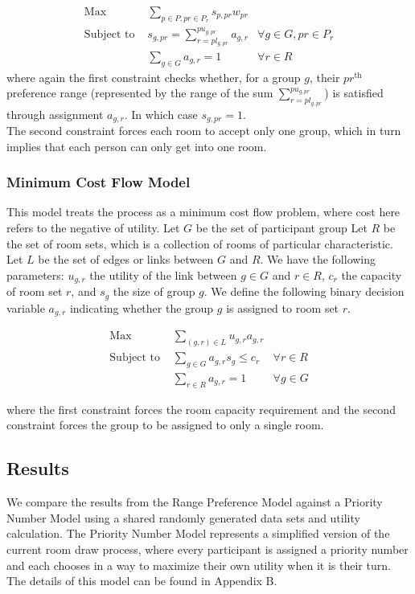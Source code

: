 \documentclass[12pt]{article}
\begin{document}
    \begin{align*}
    \text{Max} &\sum_{p \in P, pr \in P_r} s_{p,pr}w_{pr}  & \\
    \text{Subject to } &s_{g,pr} = \sum_{r = pl_{g,pr}}^{pu_{g,pr}} a_{g,r} &\forall g \in G, pr \in P_r\\ 
    &\sum_{g \in G} a_{g,r} = 1 &\forall r \in R
    \end{align*}
    where again the first constraint checks whether, for a group $g$, their $pr^{\text{th}}$ preference range (represented by the range of the sum $\sum_{r = pl_{g,pr}}^{pu_{g,pr}}$) is satisfied through assignment $a_{g,r}$. In which case $s_{g,pr} = 1$. \\
    The second constraint forces each room to accept only one group, which in turn implies that each person can only get into one room.

    

    
    \subsubsection*{Minimum Cost Flow Model}
    This model treats the process as a minimum cost flow problem, where cost here refers to the negative of utility.
    Let $G$ be the set of participant group
    Let $R$ be the set of room sets, which is a collection of rooms of particular characteristic.
    Let $L$ be the set of edges or links between $G$ and $R$.
    We have the following parameters: $u_{g,r}$ the utility of the link between $g \in G$ and $r \in R$, $c_r$ the capacity of room set $r$, and $s_g$ the size of group $g$. 
    We define the following binary decision variable $a_{g,r}$ indicating whether the group $g$ is assigned to room set $r$.
    
    \begin{align*}
        \text{Max} &\sum_{(g,r) \in L} u_{g,r}a_{g,r} &\\
        \text{Subject to } &\sum_{g \in G} a_{g,r}s_g \leq c_r 
        & \forall r \in R \\
        &\sum_{r \in R} a_{g,r} = 1 & \forall g \in G
    \end{align*}

    where the first constraint forces the room capacity requirement and the second constraint forces the group to be assigned to only a single room.

    
    \subsection*{Results}
    We compare the results from the Range Preference Model against a Priority Number Model using a shared randomly generated data sets and utility calculation. The Priority Number Model represents a simplified version of the current room draw process, where every participant is assigned a priority number and each chooses in a way to maximize their own utility when it is their turn. The details of this model can be found in Appendix B.
    
\end{document}
